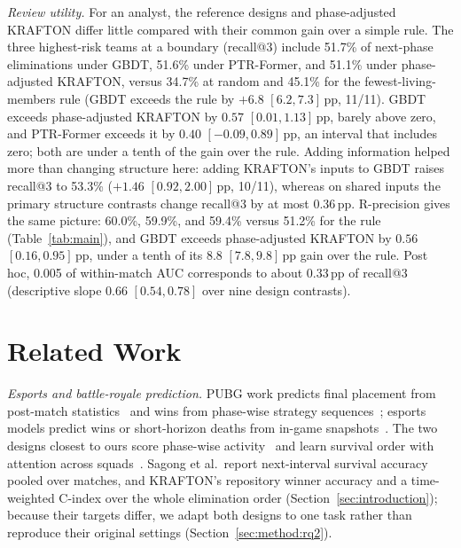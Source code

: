 \documentclass[sigconf,anonymous]{acmart}
\begin{document}
\emph{Review utility.} For an analyst, the reference designs and phase-adjusted KRAFTON differ little compared with their common gain over a simple rule. The three highest-risk teams at a boundary (recall@3) include 51.7\% of next-phase eliminations under GBDT, 51.6\% under PTR-Former, and 51.1\% under phase-adjusted KRAFTON, versus 34.7\% at random and 45.1\% for the fewest-living-members rule (GBDT exceeds the rule by $+6.8$ $[6.2,\allowbreak 7.3]$\,pp, 11/11). GBDT exceeds phase-adjusted KRAFTON by $0.57$ $[0.01,\allowbreak 1.13]$\,pp, barely above zero, and PTR-Former exceeds it by $0.40$ $[-0.09,\allowbreak 0.89]$\,pp, an interval that includes zero; both are under a tenth of the gain over the rule. Adding information helped more than changing structure here: adding KRAFTON's inputs to GBDT raises recall@3 to 53.3\% ($+1.46$ $[0.92,\allowbreak 2.00]$\,pp, 10/11), whereas on shared inputs the primary structure contrasts change recall@3 by at most 0.36\,pp. R-precision gives the same picture: 60.0\%, 59.9\%, and 59.4\% versus 51.2\% for the rule (Table~\ref{tab:main}), and GBDT exceeds phase-adjusted KRAFTON by $0.56$ $[0.16,\allowbreak 0.95]$\,pp, under a tenth of its $8.8$ $[7.8,\allowbreak 9.8]$\,pp gain over the rule. Post hoc, 0.005 of within-match AUC corresponds to about 0.33\,pp of recall@3 (descriptive slope 0.66 $[0.54,\allowbreak 0.78]$ over nine design contrasts).

\section{Related Work}
\label{sec:related}
\emph{Esports and battle-royale prediction.} PUBG work predicts final placement from post-match statistics~\cite{KagglePUBG,LeeLee25} and wins from phase-wise strategy sequences~\cite{SagongKim25}; esports models predict wins or short-horizon deaths from in-game snapshots~\cite{Hodge21,Katona19,Marshall22}. The two designs closest to ours score phase-wise activity~\cite{Sagong25a} and learn survival order with attention across squads~\cite{KRAFTON}. Sagong et al.\ report next-interval survival accuracy pooled over matches, and KRAFTON's repository winner accuracy and a time-weighted C-index over the whole elimination order (Section~\ref{sec:introduction}); because their targets differ, we adapt both designs to one task rather than reproduce their original settings (Section~\ref{sec:method:rq2}).
\end{document}
